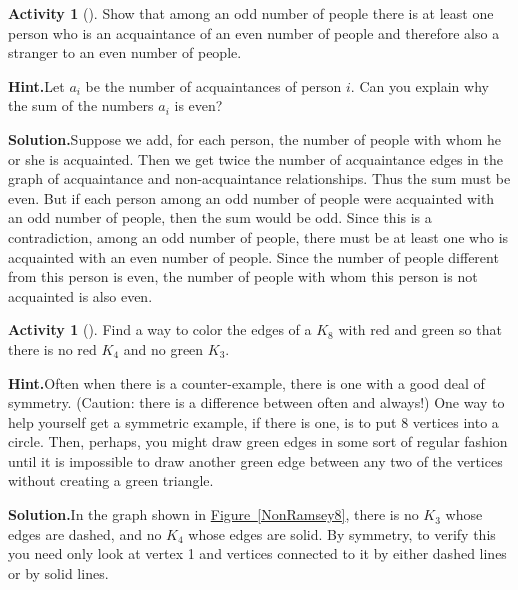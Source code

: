 \documentclass[10pt,]{book}
\theoremstyle{plain}
\theoremstyle{definition}
\newtheorem{activity}[project]{Activity}
\numberwithin{equation}{chapter}
\begin{document}
\begin{activity}[]\label{OddNoPeople}
Show that among an odd number of people there is at least one person who is an acquaintance of an even number of people and therefore also a stranger to an even number of people.%
\par\medskip\noindent%
\textbf{Hint.}\quad Let \(a_i\) be the number of acquaintances of person \(i\). Can you explain why the sum of the numbers \(a_i\) is even?%
\par\medskip\noindent%
\textbf{Solution.}\quad Suppose we add, for each person, the number of people with whom he or she is acquainted. Then we get twice the number of acquaintance edges in the graph of acquaintance and non-acquaintance relationships. Thus the sum must be even. But if each person among an odd number of people were acquainted with an odd number of people, then the sum would be odd. Since this is a contradiction, among an odd number of people, there must be at least one who is acquainted with an even number of people. Since the number of people different from this person is even, the number of people with whom this person is not acquainted is also even.%
\end{activity}
\begin{activity}[]\label{R_4_3_not8}
Find a way to color the edges of a \(K_8\) with red and green so that there is no red \(K_4\) and no green \(K_3\).%
\par\medskip\noindent%
\textbf{Hint.}\quad Often when there is a counter-example, there is one with a good deal of symmetry. (Caution: there is a difference between often and always!) One way to help yourself get a symmetric example, if there is one, is to put 8 vertices into a circle. Then, perhaps, you might draw green edges in some sort of regular fashion until it is impossible to draw another green edge between any two of the vertices without creating a green triangle.%
\par\medskip\noindent%
\textbf{Solution.}\quad In the graph shown in \hyperref[NonRamsey8]{Figure~\ref{NonRamsey8}}, there is no \(K_3\) whose edges are dashed, and no \(K_4\) whose edges are solid. By symmetry, to verify this you need only look at vertex 1 and vertices connected to it by either dashed lines or by solid lines.%
\end{activity}
\end{document}
